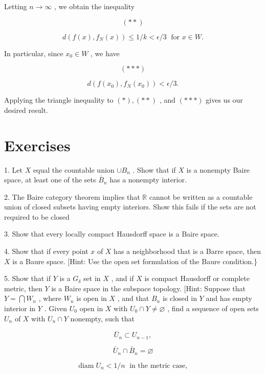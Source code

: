 Letting \(n \rightarrow  \infty\) , we obtain the inequality

\[
\left( {* * }\right)
\]

\[
d\left( {f\left( x\right) ,{f}_{N}\left( x\right) }\right)  \leq  1/k < \epsilon /3\;\text{ for }x \in  W.
\]

In particular, since \({x}_{0} \in  W\) , we have

\[
\left( {* *  * }\right)
\]

\[
d\left( {f\left( {x}_{0}\right) ,{f}_{N}\left( {x}_{0}\right) }\right)  < \epsilon /3.
\]

Applying the triangle inequality to \(\left( *\right) ,\left( {* * }\right)\) , and \(\left( {* *  * }\right)\) gives us our desired result.

\section*{Exercises}

1. Let \(X\) equal the countable union \(\cup  {B}_{n}\) . Show that if \(X\) is a nonempty Baire space, at least one of the sets \({\bar{B}}_{n}\) has a nonempty interior.

2. The Baire category theorem implies that \(\mathbb{R}\) cannot be written as a countable union of closed subsets having empty interiors. Show this fails if the sets are not required to be closed

3. Show that every locally compact Hausdorff space is a Baire space.

4. Show that if every point \(x\) of \(X\) has a neighborhood that is a Barre space, then \(X\) is a Baure space. [Hint: Use the open set formulation of the Baure condition.\}

5. Show that if \(Y\) is a \({G}_{\delta }\) set in \(X\) , and if \(X\) is compact Hausdorff or complete metric, then \(Y\) is a Baire space in the subspace topology. [Hint: Suppose that \(Y = \bigcap {W}_{n}\) , where \({W}_{n}\) is open in \(X\) , and that \({B}_{n}\) is closed in \(Y\) and has empty interior in \(Y\) . Given \({U}_{0}\) open in \(X\) with \({U}_{0} \cap  Y \neq  \varnothing\) , find a sequence of open sets \({U}_{n}\) of \(X\) with \({U}_{n} \cap  Y\) nonempty, such that

\[
{\bar{U}}_{n} \subset  {U}_{n - 1},
\]

\[
{\bar{U}}_{n} \cap  {\bar{B}}_{n} = \varnothing
\]

\[
\operatorname{diam}{U}_{n} < 1/n\;\text{ in the metric case, }
\]


